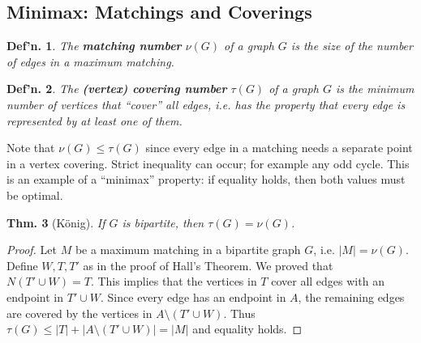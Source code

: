 \documentclass[12pt, a4paper]{book}
\newtheorem{theorem}{Thm.}[section]
\newtheorem{definition}[theorem]{Def'n.}
\theoremstyle{nonumberplain}
\newtheorem{proof}{Proof}
\begin{document}
\subsection{Minimax: Matchings and Coverings}
\begin{definition}
    The \textbf{matching number} $\nu(G)$ of a graph $G$ is the size of the number of edges in a maximum matching.
\end{definition}
\begin{definition}
    The \textbf{(vertex) covering number} $\tau(G)$ of a graph $G$ is the minimum number of vertices that ``cover'' all edges, i.e. has the property that every edge is represented by at least one of them.
\end{definition}
Note that $\nu(G)\leq\tau(G)$ since every edge in a matching needs a separate point in a vertex covering.
Strict inequality can occur; for example any odd cycle.
This is an example of a ``minimax'' property: if equality holds, then both values must be optimal.
\begin{theorem}[K\"onig]
    If $G$ is bipartite, then $\tau(G)=\nu(G)$.
\end{theorem}
\begin{proof}
    Let $M$ be a maximum matching in a bipartite graph $G$, i.e. $|M|=\nu(G)$.
    Define $W,T,T'$ as in the proof of Hall's Theorem.
    We proved that $N(T'\cup W)=T$.
    This implies that the vertices in $T$ cover all edges with an endpoint in $T'\cup W$.
    Since every edge has an endpoint in $A$, the remaining edges are covered by the vertices in $A\setminus(T'\cup W)$.
    Thus $\tau(G)\leq |T|+|A\setminus(T'\cup W)|=|M|$ and equality holds.
\end{proof}
\end{document}
